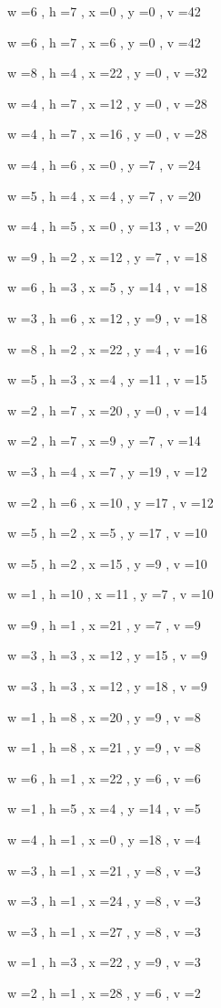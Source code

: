 \documentclass[11pt]{article}
\begin{document}
w =6 , h =7 , x =0 , y =0 , v =42
\par
w =6 , h =7 , x =6 , y =0 , v =42
\par
w =8 , h =4 , x =22 , y =0 , v =32
\par
w =4 , h =7 , x =12 , y =0 , v =28
\par
w =4 , h =7 , x =16 , y =0 , v =28
\par
w =4 , h =6 , x =0 , y =7 , v =24
\par
w =5 , h =4 , x =4 , y =7 , v =20
\par
w =4 , h =5 , x =0 , y =13 , v =20
\par
w =9 , h =2 , x =12 , y =7 , v =18
\par
w =6 , h =3 , x =5 , y =14 , v =18
\par
w =3 , h =6 , x =12 , y =9 , v =18
\par
w =8 , h =2 , x =22 , y =4 , v =16
\par
w =5 , h =3 , x =4 , y =11 , v =15
\par
w =2 , h =7 , x =20 , y =0 , v =14
\par
w =2 , h =7 , x =9 , y =7 , v =14
\par
w =3 , h =4 , x =7 , y =19 , v =12
\par
w =2 , h =6 , x =10 , y =17 , v =12
\par
w =5 , h =2 , x =5 , y =17 , v =10
\par
w =5 , h =2 , x =15 , y =9 , v =10
\par
w =1 , h =10 , x =11 , y =7 , v =10
\par
w =9 , h =1 , x =21 , y =7 , v =9
\par
w =3 , h =3 , x =12 , y =15 , v =9
\par
w =3 , h =3 , x =12 , y =18 , v =9
\par
w =1 , h =8 , x =20 , y =9 , v =8
\par
w =1 , h =8 , x =21 , y =9 , v =8
\par
w =6 , h =1 , x =22 , y =6 , v =6
\par
w =1 , h =5 , x =4 , y =14 , v =5
\par
w =4 , h =1 , x =0 , y =18 , v =4
\par
w =3 , h =1 , x =21 , y =8 , v =3
\par
w =3 , h =1 , x =24 , y =8 , v =3
\par
w =3 , h =1 , x =27 , y =8 , v =3
\par
w =1 , h =3 , x =22 , y =9 , v =3
\par
w =2 , h =1 , x =28 , y =6 , v =2
\par
\newpage
\end{document}
